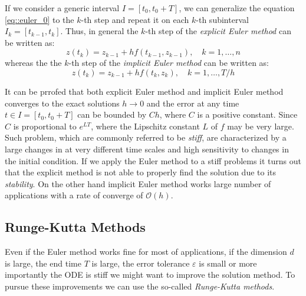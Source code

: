 If we consider a generic interval $I=[t_0, t_0+T]$, we can
generalize the equation \eqref{eq::euler_0} to the $k$-th step
and repeat it on each $k$-th subinterval $I_k=[t_{k-1}, t_k]$.
Thus, in general the $k$-th step of the \textit{explicit Euler method} can be written as:
\begin{equation}
	z(t_k) = z_{k-1} + hf(t_{k-1},z_{k-1}), \quad k=1,\dots,n
	\label{eq::euler_explicit}
\end{equation}
whereas the the $k$-th step of the \textit{implicit Euler method} can be written as:
\begin{equation}
	z(t_k) = z_{k-1} + hf(t_{k},z_{k}), \quad k=1,\dots,T/h
	\label{eq::euler_implicit}
\end{equation}

It can be prrofed that both explicit Euler method and implicit Euler 
method converges to the exact solutions $h\rightarrow0$ and 
the error at any time $t \in I = [t_0, t_0+T]$ can be bounded by $Ch$, where $C$ 
is a positive constant.
Since $C$ is proportional to $e^{LT}$, where the Lipschitz constant $L$
of $f$ may be very large. Such problem, which are commonly referred to 
be \textit{stiff}, are characterized by a large changes in at very 
different time scales and high sensitivity to changes in the initial condition.
If we apply the Euler method to a stiff problems it turns out that the
explicit method is not able to properly find the solution due to
its \textit{stability}. On the other hand implicit Euler method works
large number of applications with a rate of converge of $\mathcal{O}(h)$.

\subsection{Runge-Kutta Methods}
Even if the Euler method works fine for most of applications,
if the dimension $d$ is large, the end time $T$ is large,
the error tolerance $\varepsilon$ is small or more importantly
the ODE is stiff we might want to improve the solution method.
To pursue these improvements we can use the so-called \textit{Runge-Kutta methods}.

